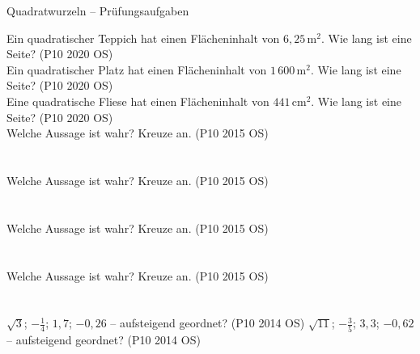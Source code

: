 \begin{aufgabe}{Quadratwurzeln – Prüfungsaufgaben}
\begin{teile}
\teil Ein quadratischer Teppich hat einen Flächeninhalt von $6{,}25\,\text{m}^2$. Wie lang ist eine Seite? \hfill (P10 2020 OS) \\ \leerfeld[m]
\teil Ein quadratischer Platz hat einen Flächeninhalt von $1\,600\,\text{m}^2$. Wie lang ist eine Seite? \hfill (P10 2020 OS) \\ \leerfeld[m]
\teil Eine quadratische Fliese hat einen Flächeninhalt von $441\,\text{cm}^2$. Wie lang ist eine Seite? \hfill (P10 2020 OS) \\ \leerfeld[cm]
\steil Welche Aussage ist wahr? Kreuze an. \hfill (P10 2015 OS)\\  \\  \\ 
\steil Welche Aussage ist wahr? Kreuze an. \hfill (P10 2015 OS)\\  \\  \\ 
\teil Welche Aussage ist wahr? Kreuze an. \hfill (P10 2015 OS)\\  \\  \\ 
\teil Welche Aussage ist wahr? Kreuze an. \hfill (P10 2015 OS)\\  \\  \\ 
\teil $\sqrt{3}$; $-\frac{1}{4}$; $1{,}7$; $-0{,}26$ – aufsteigend geordnet? \hfill (P10 2014 OS)
\teil $\sqrt{11}$; $-\frac{3}{5}$; $3{,}3$; $-0{,}62$ – aufsteigend geordnet? \hfill (P10 2014 OS)
\end{teile}
\end{aufgabe}
